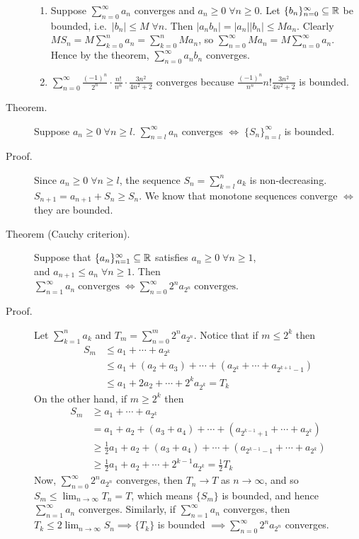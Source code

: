 \documentclass[letterpaper,11pt]{article}
\begin{document}
\begin{description}
\begin{enumerate}[1)]
  \item Suppose $\sum_{n=0}^\infty a_n$ converges and $a_n\ge 0\;\forall n\ge 0$.
      Let $\{b_n\}_{n=0}^\infty\subseteq\mathbb{R}$ be bounded, i.e.\
      $|b_n|\le M\;\forall n$. Then $|a_nb_n|=|a_n||b_n|\le Ma_n$. Clearly
      $MS_n=M\sum_{k=0}^n a_n=\sum_{k=0}^n Ma_n$, so
      $\sum_{n=0}^\infty Ma_n=M\sum_{n=0}^\infty a_n$. Hence by the theorem,
      $\sum_{n=0}^\infty a_nb_n$ converges.

  \item $\sum_{n=0}^\infty\frac{(-1)^n}{2^n}\cdot\frac{n!}{n^n}
      \cdot\frac{3n^2}{4n^2+2}$ converges because
      $\frac{(-1)^n}{n^n}n!\frac{3n^2}{4n^2+2}$ is bounded.
  \end{enumerate}


\item[Theorem.] Suppose $a_n\ge 0\;\forall n\ge l$.
  $\sum_{n=l}^\infty a_n$ converges $\iff\;\{S_n\}_{n=l}^\infty$ is bounded.

\item[Proof.] Since $a_n\ge 0\;\forall n\ge l$, the sequence
    $S_n=\sum_{k=l}^n a_k$ is non-decreasing. $S_{n+1}=a_{n+1}+S_n\ge S_n$.
    We know that monotone sequences converge $\iff$ they are bounded.


\item[Theorem (Cauchy criterion).] Suppose that
    $\{a_n\}_{n=1}^\infty\subseteq\mathbb{R}$ satisfies $a_n\ge 0\;\forall n\ge 1$,\\
    and $a_{n+1}\le a_n\;\forall n\ge 1$. Then
    $\sum_{n=1}^\infty a_n\;\text{converges}\;
    \iff\sum_{n=0}^\infty 2^na_{2^n}\;\text{converges}$.

\item[Proof.] Let $\sum_{k=1}^n a_k$ and $T_m=\sum_{n=0}^m2^na_{2^n}$.
    Notice that if $m\le 2^k$ then
    \begin{align*}
    S_m&\le a_1+\cdots+a_{2^k}\\
    &\le a_1+(a_2+a_3)+\cdots+(a_{2^k}+\cdots+a_{2^{k+1}-1})\\
    &\le a_1+2a_2+\cdots +2^ka_{2^k}=T_k
    \end{align*}
    On the other hand, if $m\ge 2^k$ then
    \begin{align*}
    S_m &\ge a_1+\cdots+a_{2^k}\\
    &= a_1+a_2+(a_3+a_4)+\cdots +(a_{2^{k-1}+1}+\cdots+a_{2^k})\\
    &\ge \frac{1}{2}a_1+a_2+(a_3+a_4)+\cdots+(a_{2^{k-1}-1}+\cdots+a_{2^k})\\
    &\ge \frac{1}{2}a_1+a_2+\cdots+2^{k-1}a_{2^k}=\frac{1}{2} T_k
    \end{align*}
    Now, $\sum_{n=0}^\infty 2^na_{2^n}$ converges, then $T_n\to T$ as
    $n\to\infty$, and so $S_m\le \lim_{n\to\infty}T_n=T$, which means
    $\{S_m\}$ is bounded, and hence $\sum_{n=1}^\infty a_n$ converges.
    Similarly, if $\sum_{n=1}^\infty a_n$ converges, then
    $T_k\le 2\lim_{n\to\infty} S_n\implies\{T_k\}$ is bounded
    $\implies\sum_{n=0}^\infty2^na_{2^n}$ converges.
\end{description}
\end{document}
